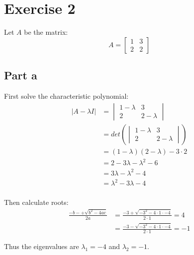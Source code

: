 \section{Exercise 2}
Let $A$ be the matrix:
\[
	A = \begin{bmatrix} 1 & 3 \\ 2 & 2 \end{bmatrix}
\]

\subsection{Part a}

First solve the characteristic polynomial:
\begin{align*}
	|A-\lambda I| & = \begin{vmatrix}
		                  1-\lambda & 3         \\
		                  2         & 2-\lambda
	                  \end{vmatrix}             \\
	              & = det\left(\begin{vmatrix}
		                           1-\lambda & 3         \\
		                           2         & 2-\lambda
	                           \end{vmatrix}\right)    \\
	              & = (1-\lambda)(2-\lambda) - 3\cdot 2 \\
	              & = 2 - 3\lambda - \lambda^2 - 6      \\
	              & = 3\lambda - \lambda^2 - 4          \\
	              & = \lambda^2 - 3\lambda - 4          \\
\end{align*}

Then calculate roots:
\begin{align*}
	\frac{-b -+ \sqrt{b^2-4ac}}{2a} & = \frac{-3 + \sqrt{-3^2-4\cdot 1\cdot -4}}{2\cdot 1} = 4  \\
	                                & = \frac{-3 - \sqrt{-3^2-4\cdot 1\cdot -4}}{2\cdot 1} = -1
\end{align*}

Thus the eigenvalues are $\lambda_1 = -4$ and $\lambda_2 = -1$.


